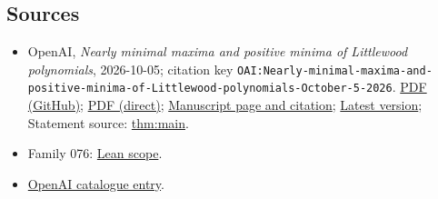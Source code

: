 \documentclass[11pt]{article}
\begin{document}
\subsection{Sources}
\begin{itemize}
\item OpenAI, \emph{Nearly minimal maxima and positive minima of Littlewood polynomials}, 2026-10-05; citation key \texttt{OAI:Nearly-minimal-maxima-and-positive-minima-of-Littlewood-polynomials-October-5-2026}. \href{https://github.com/openai/math/blob/adc7f1241b42e322a6451854ab7e4b4c146bf78a/preprints/Nearly-minimal-maxima-and-positive-minima-of-Littlewood-polynomials-October-5-2026/littlewood-lower-envelope.pdf}{PDF (GitHub)}; \href{https://github.com/openai/math/raw/adc7f1241b42e322a6451854ab7e4b4c146bf78a/preprints/Nearly-minimal-maxima-and-positive-minima-of-Littlewood-polynomials-October-5-2026/littlewood-lower-envelope.pdf}{PDF (direct)}; \href{https://github.com/openai/math/blob/adc7f1241b42e322a6451854ab7e4b4c146bf78a/preprints/Nearly-minimal-maxima-and-positive-minima-of-Littlewood-polynomials-October-5-2026/README.md}{Manuscript page and citation}; \href{https://github.com/openai/math/blob/main/preprints/Nearly-minimal-maxima-and-positive-minima-of-Littlewood-polynomials-October-5-2026/littlewood-lower-envelope.pdf}{Latest version}; Statement source: \href{https://github.com/openai/math/blob/adc7f1241b42e322a6451854ab7e4b4c146bf78a/preprints/Nearly-minimal-maxima-and-positive-minima-of-Littlewood-polynomials-October-5-2026/build/sections/introduction.tex\#L18}{thm:main}.
\item Family 076: \href{https://github.com/openai/math/blob/adc7f1241b42e322a6451854ab7e4b4c146bf78a/lean/docs/076.md}{Lean scope}.
\item \href{https://github.com/openai/math/blob/adc7f1241b42e322a6451854ab7e4b4c146bf78a/CONTENTS.md}{OpenAI catalogue entry}.
\end{itemize}
\end{document}
